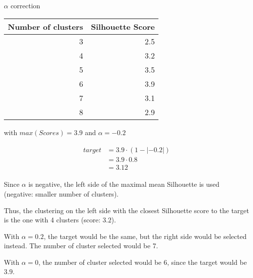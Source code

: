\begin{example}
  \centering
  \caption{$\alpha$ correction}
  \label{ex:alpha_correction}

  \begin{tabular}{r r}
    \toprule
    Number of clusters & Silhouette Score \\
    \midrule
    3 & 2.5 \\
    4 & 3.2 \\
    5 & 3.5 \\
    6 & 3.9 \\
    7 & 3.1 \\
    8 & 2.9 \\
    \bottomrule
  \end{tabular}

  \vspace{0.5cm}

  \raggedright
  with $max(Scores) = 3.9$ and $\alpha = -0.2$

  \begin{gather*}
    \begin{aligned}
    target &= 3.9 \cdot (1 - |-0.2|) \\
           &= 3.9 \cdot 0.8 \\
           &= 3.12
     \end{aligned}
   \end{gather*}

  \vspace{0.5cm}

  Since $\alpha$ is negative, the left side of the maximal mean Silhouette is used (negative: smaller number of clusters).

  Thus, the clustering on the left side with the closest Silhouette score to the target is the one with 4 clusters (score: $3.2$).

  With $\alpha = 0.2$, the target would be the same, but the right side would be selected instead.
  The number of cluster selected would be 7.

  With $\alpha = 0$, the number of cluster selected would be 6, since the target would be $3.9$.
\end{example}


